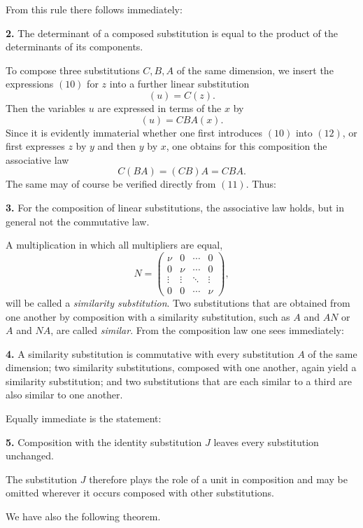 \documentclass[11pt]{article}
\begin{document}
\medskip
From this rule there follows immediately:

\medskip
\noindent\textbf{2.}
The determinant of a composed substitution is equal to the product of the determinants of its components.

\medskip
To compose three substitutions \(C,B,A\) of the same dimension, we insert the expressions \((10)\) for \(z\) into a further linear substitution
\[
(u)=C(z).
\tag{12}
\]
Then the variables \(u\) are expressed in terms of the \(x\) by
\[
(u)=CBA(x).
\tag{13}
\]
Since it is evidently immaterial whether one first introduces \((10)\) into \((12)\), or first expresses \(z\) by \(y\) and then \(y\) by \(x\), one obtains for this composition the associative law
\[
C(BA)=(CB)A=CBA.
\tag{14}
\]
The same may of course be verified directly from \((11)\). Thus:

\medskip
\noindent\textbf{3.}
For the composition of linear substitutions, the associative law holds, but in general not the commutative law.

\medskip
A multiplication in which all multipliers are equal,
\[
N=
\begin{pmatrix}
\nu & 0 & \cdots & 0\\
0 & \nu & \cdots & 0\\
\vdots & \vdots & \ddots & \vdots\\
0 & 0 & \cdots & \nu
\end{pmatrix},
\]
will be called a \emph{similarity substitution}. Two substitutions that are obtained from one another by composition with a similarity substitution, such as \(A\) and \(AN\) or \(A\) and \(NA\), are called \emph{similar}. From the composition law one sees immediately:

\medskip
\noindent\textbf{4.}
A similarity substitution is commutative with every substitution \(A\) of the same dimension; two similarity substitutions, composed with one another, again yield a similarity substitution; and two substitutions that are each similar to a third are also similar to one another.

\medskip
Equally immediate is the statement:

\medskip
\noindent\textbf{5.}
Composition with the identity substitution \(J\) leaves every substitution unchanged.

\medskip
The substitution \(J\) therefore plays the role of a unit in composition and may be omitted wherever it occurs composed with other substitutions.

We have also the following theorem.
\end{document}
